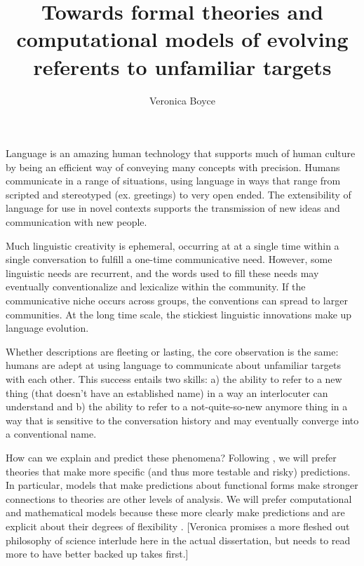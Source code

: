 \documentclass[]{article}
\title{Towards formal theories and computational models of evolving referents to unfamiliar targets}
\author{Veronica Boyce}
\begin{document}
	
	\maketitle
	
	

	
	Language is an amazing human technology that supports much of human culture by being an efficient way of conveying many concepts with precision. Humans communicate in a range of situations, using language in ways that range from scripted and stereotyped (ex. greetings) to very open ended. The extensibility of language for use in novel contexts supports the transmission of new ideas and communication with new people. 
	
	Much linguistic creativity is ephemeral, occurring at at a single time within a single conversation to fulfill a one-time communicative need.  However, some linguistic needs are recurrent, and the words used to fill these needs may eventually conventionalize and lexicalize within the community. If the communicative niche occurs across groups, the conventions can spread to larger communities.  At the long time scale, the stickiest linguistic innovations make up language evolution. 
	
	Whether descriptions are fleeting or lasting, the core observation is the same: humans are adept at using language to communicate about unfamiliar targets with each other. This success entails two skills: a) the ability to refer to a new thing (that doesn't have an established name) in a way an interlocuter can understand and b) the ability to refer to a not-quite-so-new anymore thing in a way that is sensitive to the conversation history and may eventually converge into a conventional name. 
	
	How can we explain and predict these phenomena? Following \citet{meehl1990}, we will prefer theories that make more specific (and thus more testable and risky) predictions. In particular, models that make predictions about functional forms make stronger connections to theories are other levels of analysis. We will prefer computational and mathematical models because these more clearly make predictions and are explicit about their degrees of flexibility \citep{yarkoni2017}. [Veronica promises a more fleshed out philosophy of science interlude here in the actual dissertation, but needs to read more to have better backed up takes first.]
	
	
\end{document}
